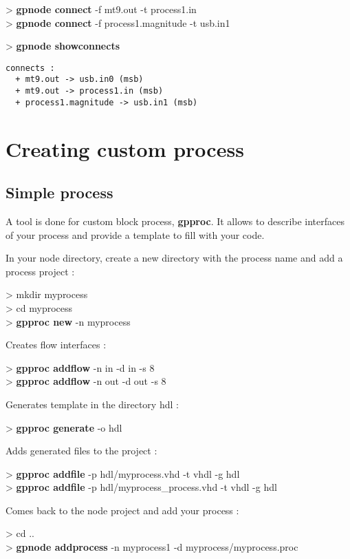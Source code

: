 \documentclass[10pt,a4paper]{article}
\begin{document}
\begin{sample}
> \textbf{gpnode connect} -f mt9.out -t process1.in\\
> \textbf{gpnode connect} -f process1.magnitude -t usb.in1
\end{sample}

\begin{sample}
> \textbf{gpnode showconnects}
\begin{Verbatim}
connects :
  + mt9.out -> usb.in0 (msb)
  + mt9.out -> process1.in (msb)
  + process1.magnitude -> usb.in1 (msb)
\end{Verbatim}
\end{sample}

\section{Creating custom process}
\subsection{Simple process}
A tool is done for custom block process, \textbf{gpproc}. It allows to describe interfaces of your process and provide a template to fill with your code.

In your node directory, create a new directory with the process name and add a process project :
\begin{sample}
> mkdir myprocess \\
> cd myprocess \\
> \textbf{gpproc new} -n myprocess
\end{sample}

Creates flow interfaces :
\begin{sample}
> \textbf{gpproc addflow} -n in -d in -s 8 \\
> \textbf{gpproc addflow} -n out -d out -s 8
\end{sample}

Generates template in the directory hdl :
\begin{sample}
> \textbf{gpproc generate} -o hdl
\end{sample}

Adds generated files to the project :
\begin{sample}
> \textbf{gpproc addfile} -p hdl/myprocess.vhd -t vhdl -g hdl \\
> \textbf{gpproc addfile} -p hdl/myprocess\_process.vhd -t vhdl -g hdl
\end{sample}

Comes back to the node project and add your process :
\begin{sample}
> cd .. \\
> \textbf{gpnode addprocess} -n myprocess1 -d myprocess/myprocess.proc
\end{sample}
\end{document}
